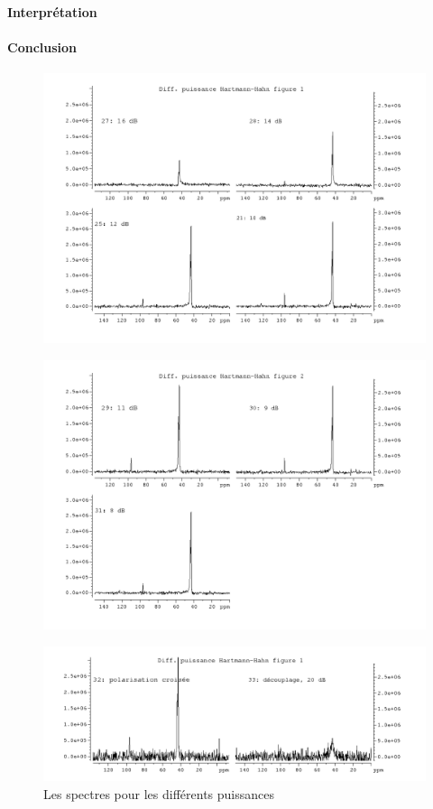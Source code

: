 \documentclass[a4paper,12pt]{scrartcl}
\begin{document}
  \paragraph{Interprétation}
  \paragraph{Conclusion}
 \begin{figure}[H]
    \includegraphics[width=\textwidth]{bilder/figure5.png}
  \end{figure}
\begin{figure}[H]
    \includegraphics[width=\textwidth]{bilder/figure6.png}
  \end{figure}
\begin{figure}[H]
 \includegraphics[width=\textwidth]{bilder/figure7.png}
    \caption{Les spectres pour les différents puissances}
   \end{figure}
 
\end{document}
